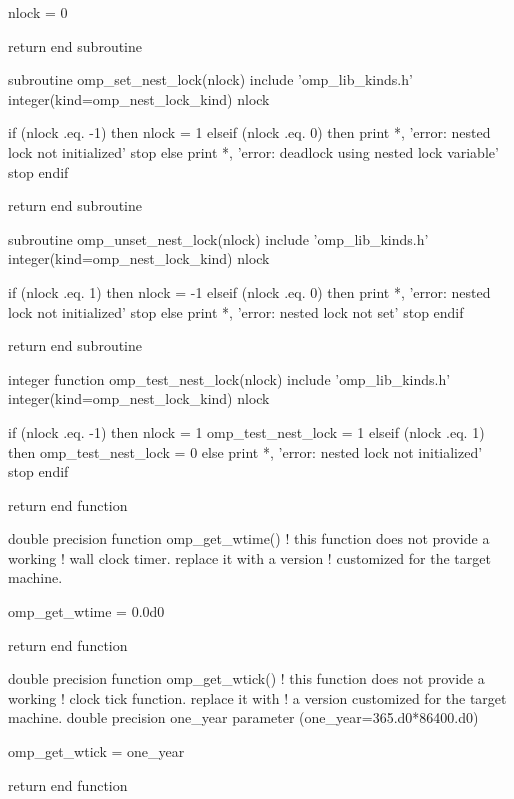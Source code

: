 {\begin{codepar}
  nlock = 0

  return
end subroutine

subroutine omp\_set\_nest\_lock(nlock)
  include 'omp\_lib\_kinds.h'
  integer(kind=omp\_nest\_lock\_kind) nlock

  if (nlock .eq. -1) then
    nlock = 1
  elseif (nlock .eq. 0) then
    print *, 'error: nested lock not initialized'
    stop
  else
    print *, 'error: deadlock using nested lock variable'
    stop
  endif

  return
end subroutine

subroutine omp\_unset\_nest\_lock(nlock)
  include 'omp\_lib\_kinds.h'
  integer(kind=omp\_nest\_lock\_kind) nlock

  if (nlock .eq. 1) then
    nlock = -1
  elseif (nlock .eq. 0) then
    print *, 'error: nested lock not initialized'
    stop
  else
    print *, 'error: nested lock not set'
    stop
  endif

  return
end subroutine

integer function omp\_test\_nest\_lock(nlock)
  include 'omp\_lib\_kinds.h'
  integer(kind=omp\_nest\_lock\_kind) nlock

  if (nlock .eq. -1) then
    nlock = 1
    omp\_test\_nest\_lock = 1
  elseif (nlock .eq. 1) then
    omp\_test\_nest\_lock = 0
  else
    print *, 'error: nested lock not initialized'
    stop
  endif

  return
end function

double precision function omp\_get\_wtime()
  ! this function does not provide a working
  ! wall clock timer. replace it with a version
  ! customized for the target machine.

  omp\_get\_wtime = 0.0d0

  return
end function

double precision function omp\_get\_wtick()
  ! this function does not provide a working
  ! clock tick function. replace it with
  ! a version customized for the target machine.
  double precision one\_year
  parameter (one\_year=365.d0*86400.d0)

  omp\_get\_wtick = one\_year

  return
end function
\end{codepar}} %


